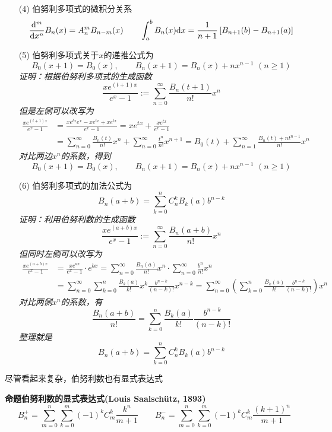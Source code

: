 \documentclass[UTF8]{ctexart}
\newcommand{\trm}[1]{{\rm #1}}
\newenvironment{proposition}[1]
    {\begin{tcolorbox}[enhanced, colback=LightYellow, breakable=true, frame hidden, borderline west={1.5mm}{-2mm}{Purple}]
    {\bfseries {\color{Purple} 命题}\quad #1} \newline}
    {\end{tcolorbox}}
\begin{document}
\begin{itemize}
    \item[(4)] 伯努利多项式的微积分关系
    \[\frac{\trm{d}^m}{\trm{d}x^n}B_n(x) = A_n^mB_{n-m}(x) \qquad \int_{a}^{b}B_n(x)\trm{d}x = \frac{1}{n+1}\left[B_{n+1}(b)-B_{n+1}(a)\right]\] 
    \item[(5)] 伯努利多项式关于\(x\)的递推公式为
    \[B_0(x+1) = B_0(x), \qquad B_n(x+1) = B_n(x) + nx^{n-1}\,\, (n \geq 1)\] 
    \textit{
        证明：根据伯努利多项式的生成函数
        \[\frac{xe^{(t+1)x}}{e^{x}-1} := \sum_{n=0}^{\infty}\frac{B_n(t+1)}{n!}x^n\]
        但是左侧可以改写为
        \begin{align*}
            \frac{xe^{(t+1)x}}{e^{x}-1} 
            &= \frac{xe^{tx}e^x -xe^{tx} + xe^{tx}}{e^{x}-1} 
            = xe^{tx} + \frac{xe^{tx}}{e^{x}-1} \\
            &= \sum_{n=0}^{\infty}\frac{B_n(t)}{n!}x^n + \sum_{n=0}^{\infty}\frac{t^n}{n!}x^{n+1} 
            = B_0(t) + \sum_{n=1}^{\infty}\frac{B_n(t) + nt^{n-1}}{n!}x^n
        \end{align*}
        对比两边\(x^n\)的系数，得到
        \[B_0(x+1) = B_0(x), \qquad B_n(x+1) = B_n(x) + nx^{n-1}\,\, (n \geq 1)\]
    }
    \item[(6)] 伯努利多项式的加法公式为
    \[B_n(a+b) = \sum_{k=0}^{n}C_n^kB_k(a)b^{n-k}\]
    \textit{
        证明：利用伯努利数的生成函数
        \[\frac{xe^{(a+b)x}}{e^{x}-1} := \sum_{n=0}^{\infty}\frac{B_n(a+b)}{n!}x^n\]
        但同时左侧可以改写为
        \begin{align*}
            \frac{xe^{(a+b)x}}{e^{x}-1} 
            &= \frac{xe^{ax}}{e^{x}-1} \cdot e^{bx}
            = \sum_{n=0}^{\infty}\frac{B_n(a)}{n!}x^n \cdot \sum_{n=0}^{\infty}\frac{b^n}{n!}x^{n} \\
            &= \sum_{n=0}^{\infty} \sum_{k=0}^{n} \frac{B_k(a)}{k!}x^k\frac{b^{n-k}}{(n-k)!}x^{n-k}
            = \sum_{n=0}^{\infty} \left(\sum_{k=0}^{n} \frac{B_k(a)}{k!}\frac{b^{n-k}}{(n-k)!}\right) x^n 
        \end{align*}
        对比两侧\(x^n\)的系数，有
        \[\frac{B_n(a+b)}{n!} = \sum_{k=0}^{n} \frac{B_k(a)}{k!}\frac{b^{n-k}}{(n-k)!}\]
        整理就是
        \[B_n(a+b) = \sum_{k=0}^{n}C_n^kB_k(a)b^{n-k}\]
    }
\end{itemize}

尽管看起来复杂，伯努利数也有显式表达式
\begin{proposition}{伯努利数的显式表达式(Louis Saalschütz, 1893)}
    \[ B_n^+ = \sum_{m=0}^{n}\sum_{k=0}^{m}(-1)^kC_m^k\frac{k^n}{m+1} \qquad B_n^- = \sum_{m=0}^{n}\sum_{k=0}^{m}(-1)^kC_m^k\frac{(k+1)^n}{m+1}\]
\end{proposition}
\end{document}
